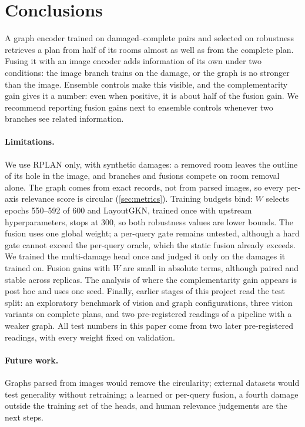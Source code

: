 \section{Conclusions}
\label{sec:conclusion}


A graph encoder trained on damaged--complete pairs and selected on robustness retrieves a plan from half of its rooms almost as well as from the complete plan.
Fusing it with an image encoder adds information of its own under two conditions: the image branch trains on the damage, or the graph is no stronger than the image.
Ensemble controls make this visible, and the complementarity gain gives it a number: even when positive, it is about half of the fusion gain.
We recommend reporting fusion gains next to ensemble controls whenever two branches see related information.

\paragraph{Limitations.}
We use RPLAN only, with synthetic damages: a removed room leaves the outline of its hole in the image, and branches and fusions compete on room removal alone.
The graph comes from exact records, not from parsed images, so every per-axis relevance score is circular (\cref{sec:metrics}).
Training budgets bind: $W$ selects epochs 550--592 of 600 and LayoutGKN, trained once with upstream hyperparameters, stops at 300, so both robustness values are lower bounds.
The fusion uses one global weight; a per-query gate remains untested, although a hard gate cannot exceed the per-query oracle, which the static fusion already exceeds.
We trained the multi-damage head once and judged it only on the damages it trained on.
Fusion gains with $W$ are small in absolute terms, although paired and stable across replicas.
The analysis of where the complementarity gain appears is post hoc and uses one seed.
Finally, earlier stages of this project read the test split: an exploratory benchmark of vision and graph configurations, three vision variants on complete plans, and two pre-registered readings of a pipeline with a weaker graph.
All test numbers in this paper come from two later pre-registered readings, with every weight fixed on validation.

\paragraph{Future work.}
Graphs parsed from images would remove the circularity; external datasets would test generality without retraining; a learned or per-query fusion, a fourth damage outside the training set of the heads, and human relevance judgements are the next steps.
